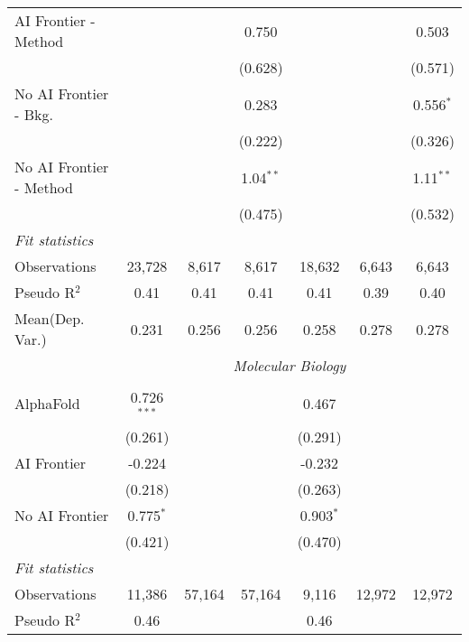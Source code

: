 \begin{tabular}{lcccccc}
   AI Frontier - Method    &               &              & 0.750       &              &             & 0.503\\   
                           &               &              & (0.628)     &              &             & (0.571)\\   
   No AI Frontier - Bkg.   &               &              & 0.283       &              &             & 0.556$^{*}$\\   
                           &               &              & (0.222)     &              &             & (0.326)\\   
   No AI Frontier - Method &               &              & 1.04$^{**}$ &              &             & 1.11$^{**}$\\   
                           &               &              & (0.475)     &              &             & (0.532)\\   
   \midrule
   \emph{Fit statistics}\\
   Observations            & 23,728        & 8,617        & 8,617       & 18,632       & 6,643       & 6,643\\  
   Pseudo R$^2$            & 0.41          & 0.41         & 0.41        & 0.41         & 0.39        & 0.40\\  
Mean(Dep. Var.) & 0.231 & 0.256 & 0.256 & 0.258 & 0.278 & 0.278 \\
   
 & \multicolumn{6}{c}{\textit{Molecular Biology}} \\ \\
   AlphaFold      & 0.726$^{***}$ &        &        & 0.467       &        &   \\   
                  & (0.261)       &        &        & (0.291)     &        &   \\   
   AI Frontier    & -0.224        &        &        & -0.232      &        &   \\   
                  & (0.218)       &        &        & (0.263)     &        &   \\   
   No AI Frontier & 0.775$^{*}$   &        &        & 0.903$^{*}$ &        &   \\   
                  & (0.421)       &        &        & (0.470)     &        &   \\   
   \midrule
   \emph{Fit statistics}\\
   Observations   & 11,386        & 57,164 & 57,164 & 9,116       & 12,972 & 12,972\\  
   Pseudo R$^2$   & 0.46          &        &        & 0.46        &        & \\  
   

\end{tabular}
